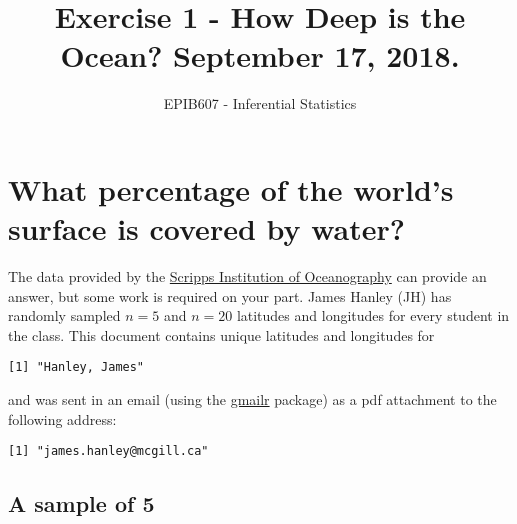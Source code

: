 \documentclass[letterpaper,9pt,twoside,printwatermark=false]{pinp}
\title{Exercise 1 - How Deep is the Ocean? September 17, 2018.}
\author[a]{EPIB607 - Inferential Statistics}
\affil[a]{Fall 2018, McGill University}
\begin{document}
\verticaladjustment{-2pt}

\maketitle
\thispagestyle{firststyle}



\section{What percentage of the world's surface is covered by
water?}\label{what-percentage-of-the-worlds-surface-is-covered-by-water}

The data provided by the
\href{https://topex.ucsd.edu/cgi-bin/get_srtm30.cgi}{Scripps Institution
of Oceanography} can provide an answer, but some work is required on
your part. James Hanley (JH) has randomly sampled \(n=5\) and \(n=20\)
latitudes and longitudes for every student in the class. This document
contains unique latitudes and longitudes for

\begin{ShadedResult}
\begin{verbatim}
[1] "Hanley, James"
\end{verbatim}
\end{ShadedResult}

and was sent in an email (using the
\href{https://cran.r-project.org/package=gmailr}{gmailr} package) as a
pdf attachment to the following address:

\begin{ShadedResult}
\begin{verbatim}
[1] "james.hanley@mcgill.ca"
\end{verbatim}
\end{ShadedResult}

\subsection*{A sample of 5}\label{a-sample-of-5}
\end{document}
